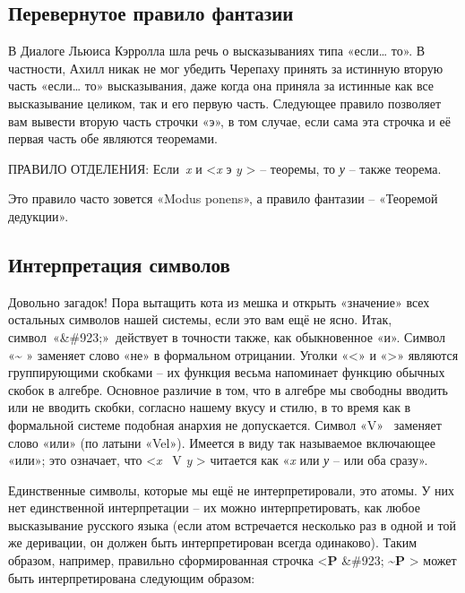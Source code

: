 \documentclass[../main.tex]{subfiles}
\begin{document}
\subsection{Перевернутое правило фантазии}

В Диалоге Льюиса Кэрролла шла речь о высказываниях типа «если\ldots{} то». В частности, Ахилл никак не мог убедить Черепаху принять за истинную вторую часть «если\ldots{} то» высказывания, даже когда она приняла за истинные как все высказывание целиком, так и его первую часть. Следующее правило позволяет вам вывести вторую часть строчки «э», в том случае, если сама эта строчка и её первая часть обе являются теоремами.

ПРАВИЛО ОТДЕЛЕНИЯ: Если~\emph{x} и \textless{}\emph{x} э \emph{y} \textgreater{} \--- теоремы, то \emph{у} \--- также теорема.

Это правило часто зовется «Modus ponens», а правило фантазии \--- «Теоремой дедукции».


\subsection{Интерпретация символов}

Довольно загадок! Пора вытащить кота из мешка и открыть «значение» всех остальных символов нашей системы, если это вам ещё не ясно. Итак, символ~«\&\#923;»~действует в точности также, как обыкновенное «и». Символ «\textbf{\textasciitilde{}} » заменяет слово «не» в формальном отрицании. Уголки «\textless» и «\textgreater» являются группирующими скобками \--- их функция весьма напоминает функцию обычных скобок в алгебре. Основное различие в том, что в алгебре мы свободны вводить или не вводить скобки, согласно нашему вкусу и стилю, в то время как в формальной системе подобная анархия не допускается. Символ «V»~ заменяет слово «или» (по латыни «Vel»). Имеется в виду так называемое включающее «или»; это означает, что \textless{}\emph{x} ~V \emph{y} \textgreater{} читается как «\emph{x} или \emph{у} \--- или оба сразу».

Единственные символы, которые мы ещё не интерпретировали, это атомы. У них нет единственной интерпретации \--- их можно интерпретировать, как любое высказывание русского языка (если атом встречается несколько раз в одной и той же деривации, он должен быть интерпретирован всегда одинаково). Таким образом, например, правильно сформированная строчка \textless{}\textbf{P} \&\#923; \textbf{\textasciitilde P} \textgreater{} может быть интерпретирована следующим образом:
\end{document}
